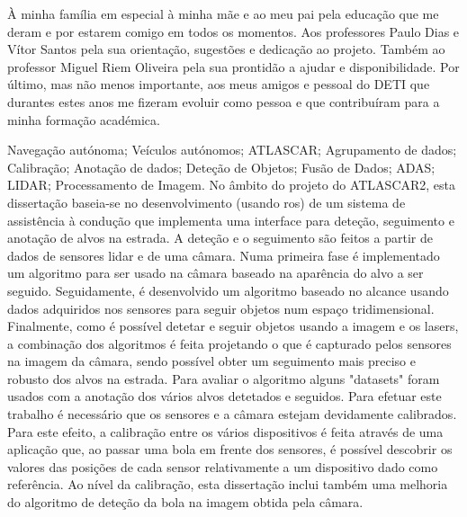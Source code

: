 \documentclass[11pt,twoside,a4paper,openright]{report}
\begin{document}
\TitlePage
  \vspace*{55mm}
       {\`A minha fam\'ilia em especial \`a minha m\~ae e ao meu pai pela educa\c c\~ao que me deram e por estarem comigo em todos os momentos. Aos professores Paulo Dias e V\'itor Santos pela sua orienta\c c\~ ao, sugest\~oes e dedica\c c\~ ao ao projeto. Tamb\'em ao professor Miguel Riem Oliveira pela sua prontid\~ao a ajudar e disponibilidade.}
  \TEXT{}
       {Por \'ultimo, mas n\~ao menos importante, aos meus amigos e pessoal do DETI que durantes estes anos me fizeram evoluir como pessoa e que contribu\'iram para a minha forma\c c\~ ao acad\' emica.}
\EndTitlePage
\titlepage\ \endtitlepage %

\TitlePage
  \vspace*{55mm}
  {Navega{\c c}\~ao aut\'onoma; Ve\'iculos aut\'onomos; ATLASCAR; Agrupamento de dados; Calibra{\c c}\~ao; Anota\c c\~ao de dados; Dete\c c\~ao de Objetos; Fus\~ao de Dados; ADAS; LIDAR; Processamento de Imagem.}
  \vspace*{5mm}
       {No \^ambito do projeto do ATLASCAR2, esta disserta\c c\~ao baseia-se no desenvolvimento (usando \gls{ros}) de um sistema de assist\^encia \`a condu\c c\~ao que implementa uma interface para dete\c c\~ao, seguimento e anota\c c\~ao de alvos na estrada. A dete\c c\~ao e o seguimento s\~ao feitos a partir de dados de sensores \gls{lidar} e de uma c\^amara. Numa primeira fase \'e implementado um algoritmo para ser usado na c\^amara baseado na apar\^encia do alvo a ser seguido. Seguidamente, \'e desenvolvido um algoritmo baseado no alcance usando dados adquiridos nos sensores para seguir objetos num espa\c co tridimensional. Finalmente, como \'e poss\'ivel detetar e seguir objetos usando a imagem e os lasers, a combina\c c\~ao dos algoritmos \'e feita  projetando o que \'e capturado pelos sensores na imagem da c\^amara, sendo poss\'ivel obter um seguimento mais preciso e robusto dos alvos na estrada. Para avaliar o algoritmo alguns "datasets" foram usados com a anota\c c\~ao dos v\'arios alvos detetados e seguidos. Para efetuar este trabalho \'e necess\'ario que os sensores e a c\^amara estejam devidamente calibrados. Para este efeito, a calibra\c c\~ao entre os v\'arios dispositivos \'e feita atrav\'es de uma aplica\c c\~ao que, ao passar uma bola em frente dos sensores, \'e poss\'ivel descobrir os valores das posi\c c\~oes de cada sensor relativamente a um dispositivo dado como refer\^encia. Ao n\'ivel da calibra\c c\~ao, esta disserta\c c\~ao inclui tamb\'em uma melhoria do algoritmo de dete\c c\~ao da bola na imagem obtida pela c\^amara.}
\EndTitlePage
\titlepage\ \endtitlepage %
\end{document}
